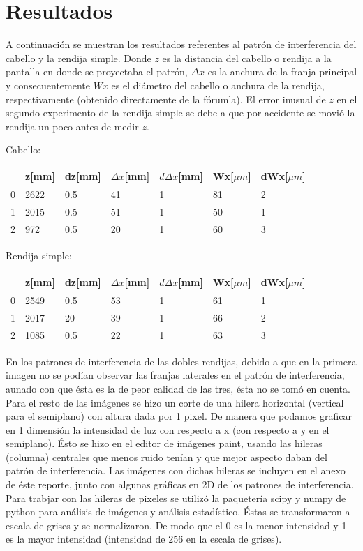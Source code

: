 \documentclass[12p]{article}
\begin{document}
\section{Resultados}

A continuación se muestran los resultados referentes al patrón de interferencia del cabello y la rendija simple. Donde $z$ es la distancia del cabello o rendija a la pantalla en donde se proyectaba el patrón, $\Delta x$ es la anchura de la franja principal y consecuentemente $Wx$ es el diámetro del cabello o anchura de la rendija, respectivamente (obtenido directamente de la fórumla). El error inusual de $z$ en el segundo experimento de la rendija simple se debe a que por accidente se movió la rendija un poco antes de medir $z$.

Cabello:

\begin{tabular}{lllllll}
\toprule
{} & z[mm] & dz[mm] & $\Delta x$[mm] & $d\Delta x$[mm] & Wx[$\mu m$] & dWx[$\mu m$] \\
\midrule
0 &  2622 &    0.5 &      41 &       1 &   81 &    2 \\
1 &  2015 &    0.5 &      51 &       1 &   50 &    1 \\
2 &   972 &    0.5 &      20 &       1 &   60 &    3 \\
\bottomrule
\end{tabular}

Rendija simple:

\begin{tabular}{lllllll}
\toprule
{} & z[mm] & dz[mm] & $\Delta x$[mm] & $d\Delta x$[mm] & Wx[$\mu m$] & dWx[$\mu m$] \\
\midrule
0 &  2549 &    0.5 &      53 &       1 &   61 &    1 \\
1 &  2017 &     20 &      39 &       1 &   66 &    2 \\
2 &  1085 &    0.5 &    22 &       1 &   63 &    3 \\
\bottomrule
\end{tabular}

En los patrones de interferencia de las dobles rendijas, debido a que en la primera imagen no se podían observar las franjas laterales en el patrón de interferencia, aunado con que ésta es la de peor calidad de las tres, ésta no se tomó en cuenta. Para el resto de las imágenes se hizo un corte de una hilera horizontal (vertical para el semiplano) con altura dada por 1 pixel. De manera que podamos graficar en 1 dimensión la intensidad de luz con respecto a x (con respecto a y en el semiplano). Ésto se hizo en el editor de imágenes paint, usando las hileras (columna) centrales que menos ruido tenían y que mejor aspecto daban del patrón de interferencia. Las imágenes con dichas hileras se incluyen en el anexo de éste reporte, junto con algunas gráficas en 2D de los patrones de interferencia. Para trabjar con las hileras de pixeles se utilizó la paquetería scipy y numpy de python para análisis de imágenes y análisis estadístico. Éstas se transformaron a escala de grises y se normalizaron. De modo que el 0 es la menor intensidad y 1 es la mayor intensidad (intensidad de 256 en la escala de grises).
\end{document}
